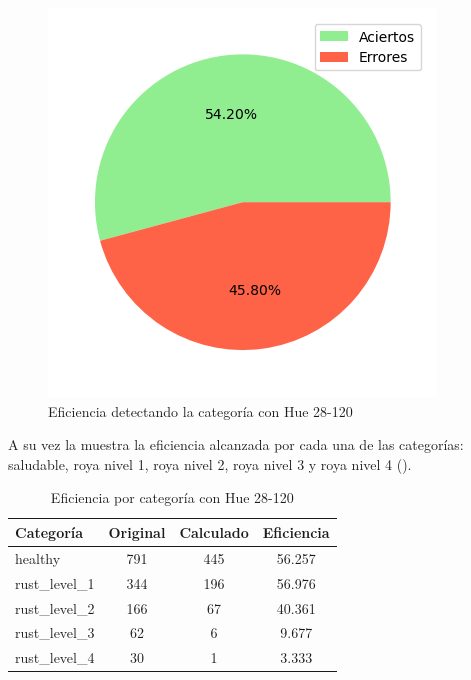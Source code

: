 \begin{figure}
\centering
\includegraphics[scale=0.6]{images/result_global_class_28_120.png}
\caption{Eficiencia detectando la categoría con Hue 28-120}
\label{img:efficiency_category_28_120}
\end{figure}

\captionsetup[figure]{skip=10pt}

A su vez la  muestra la eficiencia alcanzada por cada una de las categorías: saludable, roya nivel 1, roya nivel 2, roya nivel 3 y roya nivel 4 ().

\begin{table}[h!]
\centering
\begin{tabular}{|l|c|c|c|}
\hline 
\textbf{Categoría} & \textbf{Original} & \textbf{Calculado} & \textbf{Eficiencia} \\
\hline
healthy & 791 & 445 & 56.257 \\
\hline 
rust\_level\_1 & 344 & 196 & 56.976 \\
\hline 
rust\_level\_2 & 166 & 67 & 40.361 \\
\hline 
rust\_level\_3 & 62 & 6 & 9.677 \\
\hline 
rust\_level\_4 & 30 & 1 & 3.333 \\
\hline 
\end{tabular}
\caption{Eficiencia por categoría con Hue 28-120}
\label{table:efficiency_categories_28_120}
\end{table}

